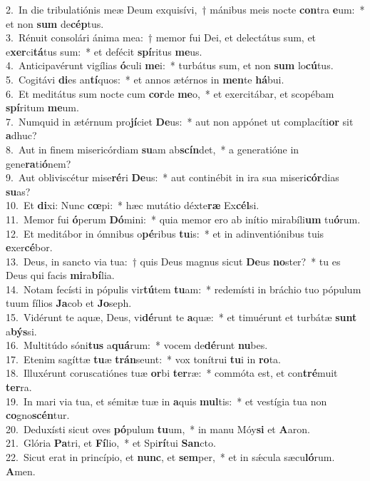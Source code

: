 {2.~}In die tribulatiónis meæ Deum exquisívi,~† mánibus meis nocte \textbf{con}tra \textbf{e}um:~* et non \textbf{sum} de\textbf{cép}tus.\\
{3.~}Rénuit consolári ánima mea:~† memor fui Dei, et delectátus sum, et e\textbf{xer}ci\textbf{tá}tus sum:~* et defécit \textbf{spí}ritus \textbf{me}us.\\
{4.~}Anticipavérunt vigílias \textbf{ó}culi \textbf{me}i:~* turbátus sum, et non \textbf{sum} lo\textbf{cú}tus.\\
{5.~}Cogitávi \textbf{di}es an\textbf{tí}quos:~* et annos ætérnos in \textbf{men}te \textbf{há}bui.\\
{6.~}Et meditátus sum nocte cum \textbf{cor}de \textbf{me}o,~* et exercitábar, et scopébam \textbf{spí}ritum \textbf{me}um.\\
{7.~}Numquid in ætérnum pro\textbf{jí}ciet \textbf{De}us:~* aut non appónet ut complacíti\textbf{or} sit \textbf{a}dhuc?\\
{8.~}Aut in finem misericórdiam \textbf{su}am ab\textbf{scín}det,~* a generatióne in gene\textbf{ra}ti\textbf{ó}nem?\\
{9.~}Aut obliviscétur mise\textbf{ré}ri \textbf{De}us:~* aut continébit in ira sua miseri\textbf{cór}dias \textbf{su}as?\\
{10.~}Et \textbf{di}xi: Nunc \textbf{cœ}pi:~* hæc mutátio déxte\textbf{ræ} Ex\textbf{cél}si.\\
{11.~}Memor fui \textbf{ó}perum \textbf{Dó}mini:~* quia memor ero ab inítio mirabíli\textbf{um} tu\textbf{ó}rum.\\
{12.~}Et meditábor in ómnibus o\textbf{pé}ribus \textbf{tu}is:~* et in adinventiónibus tuis \textbf{e}xer\textbf{cé}bor.\\
{13.~}Deus, in sancto via tua:~† quis Deus magnus sicut \textbf{De}us \textbf{no}ster?~* tu es Deus qui facis \textbf{mi}ra\textbf{bí}lia.\\
{14.~}Notam fecísti in pópulis vir\textbf{tú}tem \textbf{tu}am:~* redemísti in bráchio tuo pópulum tuum fílios \textbf{Ja}cob et \textbf{Jo}seph.\\
{15.~}Vidérunt te aquæ, Deus, vi\textbf{dé}runt te \textbf{a}quæ:~* et timuérunt et turbátæ \textbf{sunt} a\textbf{býs}si.\\
{16.~}Multitúdo sóni\textbf{tus} a\textbf{quá}rum:~* vocem de\textbf{dé}runt \textbf{nu}bes.\\
{17.~}Etenim sagíttæ \textbf{tu}æ \textbf{trán}seunt:~* vox tonítrui \textbf{tu}i in \textbf{ro}ta.\\
{18.~}Illuxérunt coruscatiónes tuæ \textbf{or}bi \textbf{ter}ræ:~* commóta est, et con\textbf{tré}muit \textbf{ter}ra.\\
{19.~}In mari via tua, et sémitæ tuæ in \textbf{a}quis \textbf{mul}tis:~* et vestígia tua non \textbf{co}gno\textbf{scén}tur.\\
{20.~}Deduxísti sicut oves \textbf{pó}pulum \textbf{tu}um,~* in manu Móy\textbf{si} et \textbf{A}aron.\\
{21.~}Glória \textbf{Pa}tri, et \textbf{Fí}lio,~* et Spi\textbf{rí}tui \textbf{San}cto.\\
{22.~}Sicut erat in princípio, et \textbf{nunc}, et \textbf{sem}per,~* et in sǽcula sæcu\textbf{ló}rum. \textbf{A}men.\\
